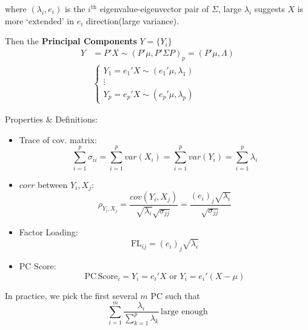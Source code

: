     where $ (\lambda _i,e_i) $ is the $ i^\mathrm{th} $ eigenvalue-eigenvector pair of $ \Sigma  $, large $ \lambda _i $ suggests $ X $ is more `extended' in $ e_i $ direction(large variance).
    
    Then the \textbf{Principal Components} $ Y=\{Y_i\} $ 
    \begin{align}
        Y&=P'X\sim (P'\mu,P'\Sigma P)_p=(P'\mu,\Lambda )\\
        &\begin{cases}
            Y_1=e_1'X\sim (e_1'\mu,\lambda _1)\\
            \vdots\\
            Y_p=e_p'X\sim (e_p'\mu,\lambda _p)
        \end{cases}
    \end{align}

    Properties \& Definitions:
    \begin{itemize}[topsep=2pt,itemsep=2pt]
        \item Trace of cov. matrix:
        \begin{equation}
            \sum_{i=1}^p\sigma _{ii}=\sum_{i=1}^pvar(X_i)=\sum_{i=1}^pvar(Y_i)=\sum_{i=1}^p\lambda_i
        \end{equation}
        \item $ corr $ between $ Y_i,X_j $:
        \begin{equation}
            \rho_{Y_i,X_j}=\dfrac{cov(Y_i,X_j)}{\sqrt{\lambda _i}\sqrt{\sigma _{jj}}}=\dfrac{(e_{i})_j\sqrt{\lambda _i}}{\sqrt{\sigma _{jj}}} 
        \end{equation}
        \item Factor Loading:
        \begin{equation}
             \mathrm{FL}_{ij}=(e_{i})_j\sqrt{\lambda _i}
        \end{equation}
        \item PC Score:
        \begin{equation}
            \mathrm{PC\, Score}_i=Y_i=e_i'X \text{ or } Y_i=e_i'(X-\mu)
        \end{equation}
        
        
    \end{itemize}
    
    In practice, we pick the first several $ m $ PC such that
    \begin{equation}
        \sum_{i=1}^m\dfrac{\lambda _i}{\sum\limits_{k=1}^p\lambda _k}\,\text{large enough} 
    \end{equation}
    
